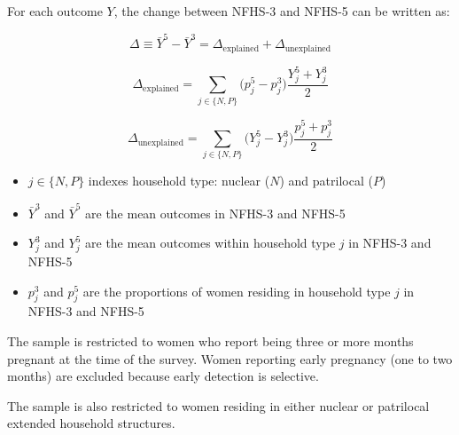 \documentclass[12pt]{article}
\begin{document}
For each outcome $Y$, the change between NFHS-3 and NFHS-5 can be written as:

\begin{equation}
\Delta \equiv \bar Y^{5} - \bar Y^{3}
= \Delta_{\text{explained}} + \Delta_{\text{unexplained}}
\end{equation}

\begin{equation}
\Delta_{\text{explained}} =
\sum_{j \in \{N,P\}} \big(p_j^{5} - p_j^{3}\big)\frac{Y_j^{5} + Y_j^{3}}{2}
\end{equation}

\begin{equation}
\Delta_{\text{unexplained}} =
\sum_{j \in \{N,P\}} \big(Y_j^{5} - Y_j^{3}\big)\frac{p_j^{5} + p_j^{3}}{2}
\end{equation}

\begin{itemize}
    \item $j \in \{N,P\}$ indexes household type: nuclear ($N$) and patrilocal ($P$)
    \item $\bar Y^{3}$ and $\bar Y^{5}$ are the mean outcomes in NFHS-3 and NFHS-5
    \item $Y_j^{3}$ and $Y_j^{5}$ are the mean outcomes within household type $j$ in NFHS-3 and NFHS-5
    \item $p_j^{3}$ and $p_j^{5}$ are the proportions of women residing in household type $j$ in NFHS-3 and NFHS-5
\end{itemize}



\begin{table}[!htbp]
    \centering
    \begin{threeparttable}[t]
        \caption{:  None of the improvement in the outcomes is explained by changing composition in household structures}
        \label{tab:decomposition}

        \scriptsize
        \setlength{\tabcolsep}{10pt}
        \renewcommand{\arraystretch}{2.5}

        

        \begin{tablenotes}
           \item The sample is restricted to women who report being three or more months pregnant at the time of the survey. Women reporting early pregnancy (one to two months) are excluded because early detection is selective.
            \item The sample is also restricted to women residing in either nuclear or patrilocal extended household structures. 
            
        \end{tablenotes}
    \end{threeparttable}
\end{table}
\end{document}
